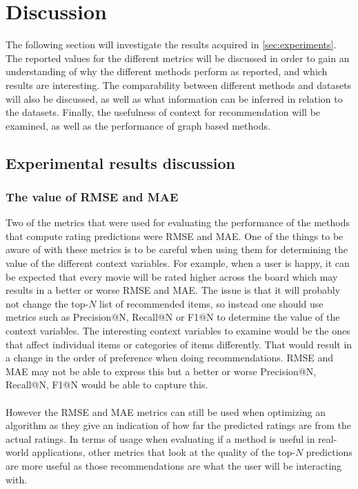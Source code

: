 \section{Discussion}\label{sec:discussion}
The following section will investigate the results acquired in \autoref{sec:experiments}.
The reported values for the different metrics will be discussed in order to gain an understanding of why the different methods perform as reported, and which results are interesting.
The comparability between different methods and datasets will also be discussed, as well as what information can be inferred in relation to the datasets.
Finally, the usefulness of context for recommendation will be examined, as well as the performance of graph based methods.


\subsection{Experimental results discussion}
\subsubsection{The value of RMSE and MAE}
Two of the metrics that were used for evaluating the performance of the methods that compute rating predictions were RMSE and MAE.
One of the things to be aware of with these metrics is to be careful when using them for determining the value of the different context variables.
For example, when a user is happy, it can be expected that every movie will be rated higher across the board which may results in a better or worse RMSE and MAE.
The issue is that it will probably not change the top-$N$ list of recommended items, so instead one should use metrics such as Precision@N, Recall@N or F1@N to determine the value of the context variables.
The interesting context variables to examine would be the ones that affect individual items or categories of items differently.
That would result in a change in the order of preference when doing recommendations.
RMSE and MAE may not be able to express this but a better or worse Precision@N, Recall@N, F1@N would be able to capture this.
\\\\
However the RMSE and MAE metrics can still be used when optimizing an algorithm as they give an indication of how far the predicted ratings are from the actual ratings.
In terms of usage when evaluating if a method is useful in real-world applications, other metrics that look at the quality of the top-$N$ predictions are more useful as those recommendations are what the user will be interacting with.

